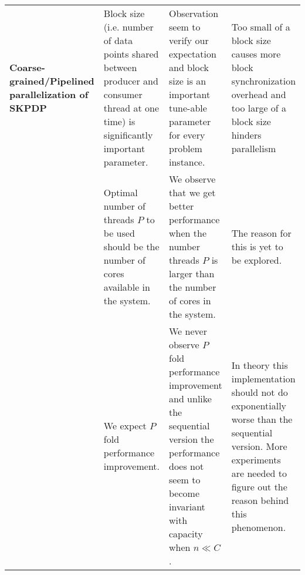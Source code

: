 \begin{table}[htbp]
\begin{center}
\begin{tabular}{|p{}|p{}|p{}|p{}|}
\hline

\textbf{Coarse-grained/Pipelined parallelization of SKPDP} 
& Block size (i.e. number of data points shared between producer and consumer thread at one time) is significantly important parameter.
& Observation seem to verify our expectation and block size is an important tune-able  parameter for every problem instance.
& Too small of a block size causes more block synchronization overhead and too large of a block size hinders parallelism\\
\cline{2-4} 
& Optimal number of threads $P$ to be used should be the number of cores available in the system.
& We observe that we get better performance when the number threads $P$ is larger than the number of cores in the system.
& The reason for this is yet to be explored.\\
\cline{2-4} 
& We expect $P$ fold performance improvement.
& We never observe $P$ fold performance improvement and unlike the sequential version the performance does not seem to become invariant with capacity when $n \ll C$.
& In theory this implementation should not do exponentially worse than the sequential version. More experiments are needed to figure out the reason behind this phenomenon. \\
\hline




\hline
\end{tabular}
\label{tab:result-summery}
\end{center}
\end{table}